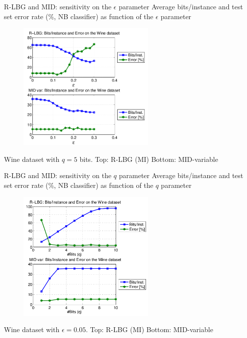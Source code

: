 \documentclass{beamer}
\begin{document}
\begin{frame}{R-LBG and MID: sensitivity on the $\epsilon$ parameter}
Average bits/instance and test set error rate (\%, NB classifier) 
as function of the $\epsilon$ parameter
\begin{figure}
	\centering
	\includegraphics[width=0.6\textwidth]{fig4.png}
\end{figure}
{\small Wine dataset with $q=5$ bits. Top: R-LBG (MI) Bottom: MID-variable}
\end{frame}


\begin{frame}{R-LBG and MID: sensitivity on the $q$ parameter}
Average bits/instance and test set error rate (\%, NB classifier) 
as function of the $q$ parameter
\begin{figure}
	\centering
	\includegraphics[width=0.6\textwidth]{fig5.png}
\end{figure}
{\small Wine dataset with $\epsilon=0.05$. Top: R-LBG (MI) Bottom: MID-variable}
\end{frame}


\end{document}
